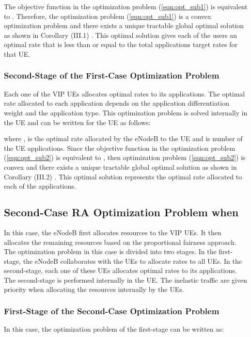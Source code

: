 \documentclass[journal]{IEEEtran} 				\IEEEoverridecommandlockouts 						\usepackage{amsmath,amssymb}
\begin{document}
The objective function in the optimization problem (\ref{eqn:opt_sub1}) is equivalent to . Therefore, the optimization problem (\ref{eqn:opt_sub1}) is a convex optimization problem and there exists a unique tractable global optimal solution as shown in Corollary (III.1) \cite{Ahmed_Utility3}. This optimal solution gives each of the  users an optimal rate  that is  less than or equal to the total applications target rates for that UE.
\subsubsection{Second-Stage of the First-Case Optimization Problem}\label{FC-SS-RA}
Each one of the  VIP UEs allocates optimal rates  to its  applications. The optimal rate allocated to each application depends on the application differentiation weight and the application type. This optimization problem is solved internally in the UE and can be written for the  UE as follows:

where ,  is the optimal rate allocated by the eNodeB to the  UE and  is number of the UE applications.
Since the objective function in the optimization problem (\ref{eqn:opt_sub2}) is equivalent to ,
then optimization problem (\ref{eqn:opt_sub2}) is convex and there exists a unique tractable global optimal solution as shown in Corollary (III.2) \cite{Ahmed_Utility3}. This optimal solution represents the optimal rate  allocated to each of the  applications.
\subsection{Second-Case RA Optimization Problem when } \label{Second-Case-RA}
In this case, the eNodeB first allocates resources to the  VIP UEs. It then allocates the remaining resources based on the proportional fairness approach. The optimization problem in this case is divided into two stages. In the first-stage, the eNodeB collaborates with the UEs to allocate rates  to all UEs. In the second-stage, each one of these  UEs allocates optimal rates  to its applications. The second-stage is performed internally in the UE. The inelastic traffic are given priority when allocating the resources internally by the UEs.
\subsubsection{First-Stage of the Second-Case Optimization Problem}\label{FC-SS-RA}
In this case, the optimization problem of the first-stage can be written as:
\end{document}
